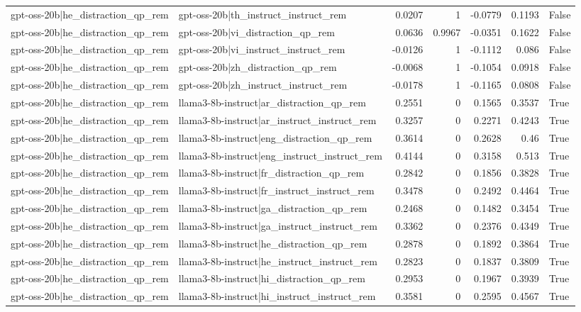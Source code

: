\begin{table}
\begin{tabular}{l l r r r r l}
gpt-oss-20b|he_distraction_qp_rem & gpt-oss-20b|th_instruct_instruct_rem & 0.0207 & 1 & -0.0779 & 0.1193 & False \\
gpt-oss-20b|he_distraction_qp_rem & gpt-oss-20b|vi_distraction_qp_rem & 0.0636 & 0.9967 & -0.0351 & 0.1622 & False \\
gpt-oss-20b|he_distraction_qp_rem & gpt-oss-20b|vi_instruct_instruct_rem & -0.0126 & 1 & -0.1112 & 0.086 & False \\
gpt-oss-20b|he_distraction_qp_rem & gpt-oss-20b|zh_distraction_qp_rem & -0.0068 & 1 & -0.1054 & 0.0918 & False \\
gpt-oss-20b|he_distraction_qp_rem & gpt-oss-20b|zh_instruct_instruct_rem & -0.0178 & 1 & -0.1165 & 0.0808 & False \\
gpt-oss-20b|he_distraction_qp_rem & llama3-8b-instruct|ar_distraction_qp_rem & 0.2551 & 0 & 0.1565 & 0.3537 & True \\
gpt-oss-20b|he_distraction_qp_rem & llama3-8b-instruct|ar_instruct_instruct_rem & 0.3257 & 0 & 0.2271 & 0.4243 & True \\
gpt-oss-20b|he_distraction_qp_rem & llama3-8b-instruct|eng_distraction_qp_rem & 0.3614 & 0 & 0.2628 & 0.46 & True \\
gpt-oss-20b|he_distraction_qp_rem & llama3-8b-instruct|eng_instruct_instruct_rem & 0.4144 & 0 & 0.3158 & 0.513 & True \\
gpt-oss-20b|he_distraction_qp_rem & llama3-8b-instruct|fr_distraction_qp_rem & 0.2842 & 0 & 0.1856 & 0.3828 & True \\
gpt-oss-20b|he_distraction_qp_rem & llama3-8b-instruct|fr_instruct_instruct_rem & 0.3478 & 0 & 0.2492 & 0.4464 & True \\
gpt-oss-20b|he_distraction_qp_rem & llama3-8b-instruct|ga_distraction_qp_rem & 0.2468 & 0 & 0.1482 & 0.3454 & True \\
gpt-oss-20b|he_distraction_qp_rem & llama3-8b-instruct|ga_instruct_instruct_rem & 0.3362 & 0 & 0.2376 & 0.4349 & True \\
gpt-oss-20b|he_distraction_qp_rem & llama3-8b-instruct|he_distraction_qp_rem & 0.2878 & 0 & 0.1892 & 0.3864 & True \\
gpt-oss-20b|he_distraction_qp_rem & llama3-8b-instruct|he_instruct_instruct_rem & 0.2823 & 0 & 0.1837 & 0.3809 & True \\
gpt-oss-20b|he_distraction_qp_rem & llama3-8b-instruct|hi_distraction_qp_rem & 0.2953 & 0 & 0.1967 & 0.3939 & True \\
gpt-oss-20b|he_distraction_qp_rem & llama3-8b-instruct|hi_instruct_instruct_rem & 0.3581 & 0 & 0.2595 & 0.4567 & True \\

\end{tabular}
\end{table}
